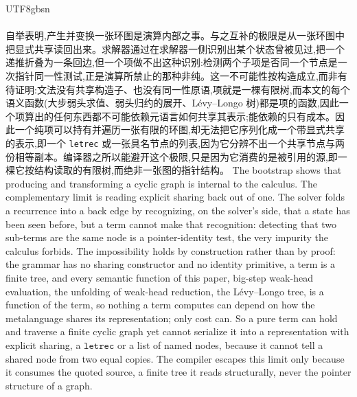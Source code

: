 \begin{CJK*}{UTF8}{gbsn}
  \paragraph{}
  \ifPaperChinese
  自举表明,产生并变换一张环图是演算内部之事。与之互补的极限是从一张环图中把显式共享读回出来。求解器通过在求解器一侧识别出某个状态曾被见过,把一个递推折叠为一条回边,但一个项做不出这种识别:检测两个子项是否同一个节点是一次指针同一性测试,正是演算所禁止的那种非纯。这一不可能性按构造成立,而非有待证明:文法没有共享构造子、也没有同一性原语,项就是一棵有限树,而本文的每个语义函数(大步弱头求值、弱头归约的展开、Lévy--Longo 树)都是项的函数,因此一个项算出的任何东西都不可能依赖元语言如何共享其表示;能依赖的只有成本。因此一个纯项可以持有并遍历一张有限的环图,却无法把它序列化成一个带显式共享的表示,即一个 \texttt{letrec} 或一张具名节点的列表,因为它分辨不出一个共享节点与两份相等副本。编译器之所以能避开这个极限,只是因为它消费的是被引用的源,即一棵它按结构读取的有限树,而绝非一张图的指针结构。
  \else
  The bootstrap shows that producing and transforming a cyclic graph is internal to the calculus. The complementary limit is reading explicit sharing back out of one. The solver folds a recurrence into a back edge by recognizing, on the solver's side, that a state has been seen before, but a term cannot make that recognition: detecting that two sub-terms are the same node is a pointer-identity test, the very impurity the calculus forbids. The impossibility holds by construction rather than by proof: the grammar has no sharing constructor and no identity primitive, a term is a finite tree, and every semantic function of this paper, big-step weak-head evaluation, the unfolding of weak-head reduction, the L\'evy--Longo tree, is a function of the term, so nothing a term computes can depend on how the metalanguage shares its representation; only cost can. So a pure term can hold and traverse a finite cyclic graph yet cannot serialize it into a representation with explicit sharing, a $\mathtt{letrec}$ or a list of named nodes, because it cannot tell a shared node from two equal copies. The compiler escapes this limit only because it consumes the quoted source, a finite tree it reads structurally, never the pointer structure of a graph.
  \fi


\end{CJK*}
